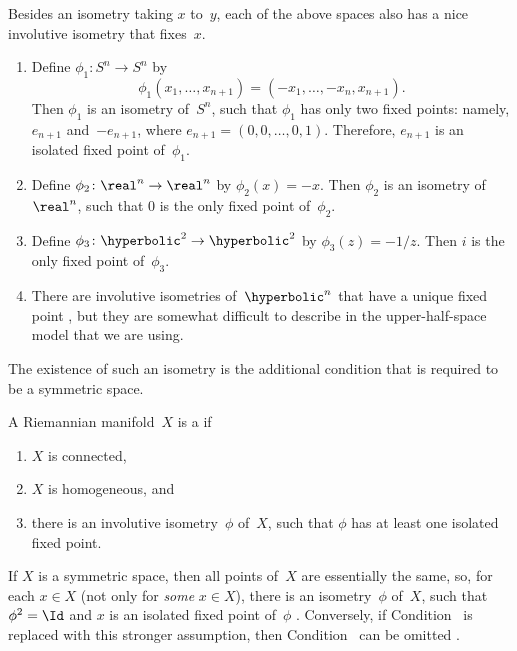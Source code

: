 Besides an isometry taking $x$ to~$y$, each of the above spaces also
has a nice involutive isometry that fixes~$x$.
 \begin{enumerate} \itemsep=\smallskipamount
 \item Define $\phi_1 \colon S^n \to S^n$ by
 $$ \phi_1(x_1,\ldots,x_{n+1}) = (-x_1,\ldots,-x_n,x_{n+1}) .$$
 Then $\phi_1$ is an isometry of~$S^n$, such that $\phi_1$ has only
two fixed points: namely, $e_{n+1}$ and~$-e_{n+1}$, where $e_{n+1} =
(0,0,\ldots,0,1)$. Therefore, $e_{n+1}$ is an isolated fixed point
of~$\phi_1$.
 \item Define $\phi_2 \colon \real^n \to \real^n$ by $\phi_2(x) =
-x$. Then $\phi_2$ is an isometry of~$\real^n$, such that $0$ is the
only fixed point of~$\phi_2$.
 \item Define $\phi_3 \colon \hyperbolic^2 \to \hyperbolic^2$ by
$\phi_3(z) = -1/z$. Then $i$ is the only fixed point of~$\phi_3$.
 \item There are involutive isometries of~$\hyperbolic^n$ that have a
unique fixed point , but they are somewhat
difficult to describe in the upper-half-space model that we are using.
 \end{enumerate}
The existence of such an isometry is the additional condition that is
required to be a symmetric space.

\begin{defn} \label{symmDefn}
 A Riemannian manifold~$X$ is a  if
 \begin{enumerate}
 \item $X$ is connected,
 \item \label{symmDefn-homog}
 $X$ is homogeneous, and
 \item \label{symmDefn-fp}
 there is an involutive isometry~$\phi$ of~$X$, such that $\phi$ has
at least one isolated fixed point.
 \end{enumerate}
 \end{defn}

\begin{rem}
 If $X$ is a symmetric space, then all points of~$X$ are essentially
the same, so, for each $x \in X$ (not only for \emph{some} $x \in X$),
there is an isometry~$\phi$ of~$X$, such that $\phi^2 = \Id$ and $x$
is an isolated fixed point of~$\phi$ .
Conversely, if Condition~ is replaced with this
stronger assumption, then Condition~ can be
omitted .
 \end{rem}

